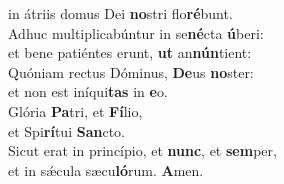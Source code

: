 \oddverse in átriis domus Dei \textbf{no}stri flo\textbf{ré}bunt.\\
\evenverse Adhuc multiplicabúntur in se\textbf{né}cta \textbf{ú}beri:~\*\\
\evenverse et bene patiéntes erunt, \textbf{ut} an\textbf{nún}tient:\\
\oddverse Quóniam rectus Dóminus, \textbf{De}us \textbf{no}ster:~\*\\
\oddverse et non est iníqui\textbf{tas} in \textbf{e}o.\\
\evenverse Glória \textbf{Pa}tri, et \textbf{Fí}lio,~\*\\
\evenverse et Spi\textbf{rí}tui \textbf{San}cto.\\
\oddverse Sicut erat in princípio, et \textbf{nunc}, et \textbf{sem}per,~\*\\
\oddverse et in sǽcula sæcu\textbf{ló}rum. \textbf{A}men.\\
